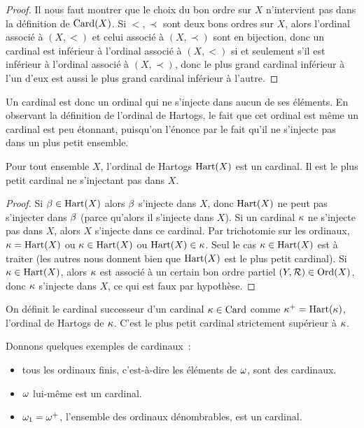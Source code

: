 \begin{proof}
  Il nous faut montrer que le choix du bon ordre sur $X$ n'intervient pas dans
  la définition de $\operatorname{Card}(X)$. Si $<,\prec$ sont deux bons ordres sur $X$, alors
  l'ordinal associé à $(X,<)$ et celui associé à $(X,\prec)$ sont en bijection,
  donc un cardinal est inférieur à l'ordinal associé à $(X,<)$ si et seulement
  s'il est inférieur à l'ordinal associé à $(X,\prec)$, donc le plus grand
  cardinal inférieur à l'un d'eux est aussi le plus grand cardinal inférieur à
  l'autre.
\end{proof}

Un cardinal est donc un ordinal qui ne s'injecte dans aucun de ses éléments.
En observant la définition de l'ordinal de Hartogs, le fait que cet ordinal est
même un cardinal est peu étonnant, puisqu'on l'énonce par le fait qu'il ne
s'injecte pas dans un plus petit ensemble.

\begin{property}
  Pour tout ensemble $X$, l'ordinal de Hartogs $\operatorname{Hart}(X)$ est un cardinal.
  Il est le plus petit cardinal ne s'injectant pas dans $X$.
\end{property}

\begin{proof}
  Si $\beta\in\operatorname{Hart}(X)$ alors $\beta$ s'injecte dans $X$, donc $\operatorname{Hart}(X)$ ne
  peut pas s'injecter dans $\beta$ (parce qu'alors il s'injecte dans $X$). Si
  un cardinal $\kappa$ ne s'injecte pas dans $X$, alors $X$ s'injecte dans ce
  cardinal. Par trichotomie sur les ordinaux, $\kappa = \operatorname{Hart}(X)$ ou
  $\kappa \in \operatorname{Hart}(X)$ ou $\operatorname{Hart}(X) \in \kappa$. Seul le cas
  $\kappa\in\operatorname{Hart}(X)$ est à traiter (les autres nous donnent bien que
  $\operatorname{Hart}(X)$ est le plus petit cardinal). Si $\kappa\in\operatorname{Hart}(X)$, alors $\kappa$
  est associé à un certain bon ordre partiel $(Y,\mathord{\mathrel{\mathcal{R}}})\in\operatorname{Ord}(X)$,
  donc $\kappa$ s'injecte dans $X$, ce qui est faux par hypothèse.
\end{proof}

\begin{definition}
  On définit le cardinal successeur d'un cardinal $\kappa\in\operatorname{Card}$ comme
  $\kappa^{+} = \operatorname{Hart}(\kappa)$, l'ordinal de Hartogs de $\kappa$. C'est le
  plus petit cardinal strictement supérieur à $\kappa$.
\end{definition}

\begin{example}
  Donnons quelques exemples de cardinaux~:
  \begin{itemize}
  \item tous les ordinaux finis, c'est-à-dire les éléments de $\omega$, sont des
    cardinaux.
  \item $\omega$ lui-même est un cardinal.
  \item $\omega_1 = \omega^{+}$, l'ensemble des ordinaux dénombrables, est un
    cardinal.
  \end{itemize}
\end{example}

